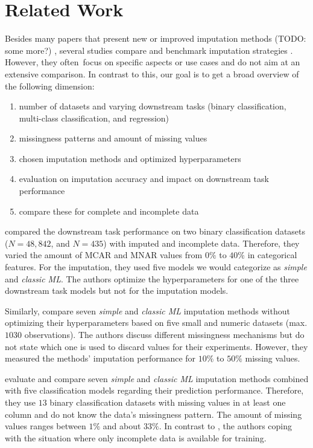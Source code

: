 \section{Related Work}

Besides many papers that present new or improved imputation methods (TODO: some more?) \citep{Imputation_Benchmark_4, Imputation_Benchmark_6}, several studies compare and benchmark imputation strategies \citep{Imputation_Benchmark_1, Imputation_Benchmark_2, Imputation_Benchmark_3}. However, they often focus on specific aspects or use cases and do not aim at an extensive comparison. In contrast to this, our goal is to get a broad overview of the following  dimension:
%
\begin{enumerate}
	\item number of datasets and varying downstream tasks (binary classification, multi-class classification, and regression)
	\item missingness patterns and amount of missing values
	\item chosen imputation methods and optimized hyperparameters
	\item evaluation on imputation accuracy and impact on downstream task performance
	\item compare these for complete and incomplete data
\end{enumerate}

\cite{Imputation_Benchmark_3} compared the downstream task performance on two binary classification datasets ($N = 48,842$, and $N = 435$) with imputed and incomplete data. Therefore, they varied the amount of MCAR and MNAR values from $0\%$ to $40\%$ in categorical features. For the imputation, they used five models we would categorize as \emph{simple} and \emph{classic ML}. The authors optimize the hyperparameters for one of the three downstream task models but not for the imputation models.

Similarly, \cite{Imputation_Benchmark_2} compare seven \emph{simple} and \emph{classic ML} imputation methods without optimizing their hyperparameters based on five small and numeric datasets (max. $1030$ observations). The authors discuss different missingness mechanisms but do not state which one is used to discard values for their experiments. However, they measured the methods' imputation performance for $10\%$ to $50\%$ missing values.

\cite{Imputation_Benchmark_1} evaluate and compare seven \emph{simple} and \emph{classic ML} imputation methods combined with five classification models regarding their prediction performance. Therefore,  they use $13$ binary classification datasets with missing values in at least one column and do not know the data's missingness pattern. The amount of missing values ranges between $1\%$ and about $33\%$. In contrast to \citep{Imputation_Benchmark_3, Imputation_Benchmark_2}, the authors coping with the situation where only incomplete data is available for training.


